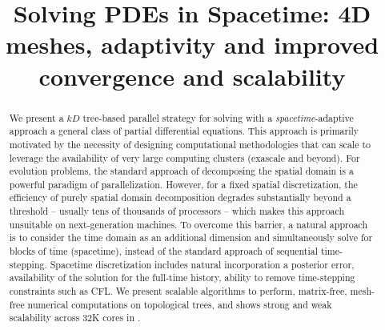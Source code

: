 \documentclass[sigconf]{acmart}
\begin{document}
%
\title{Solving PDEs in Spacetime: 4D meshes, adaptivity and improved convergence and scalability}







%

%
\begin{abstract}
We present a $kD$ tree-based parallel strategy for solving with a {\it spacetime}-adaptive approach a general class of partial differential equations. This approach is primarily motivated by the necessity of designing computational methodologies that can scale to leverage the availability of very large computing clusters (exascale and beyond). For evolution problems, the standard approach of decomposing the spatial domain is a powerful paradigm of parallelization. However, for a fixed spatial discretization, the efficiency of purely spatial domain decomposition degrades substantially beyond a threshold -- usually tens of thousands of processors -- which makes this approach unsuitable on next-generation machines. To overcome this barrier, a natural approach is to consider the time domain as an additional dimension and simultaneously solve for blocks of time (spacetime), instead of the standard approach of sequential time-stepping. Spacetime discretization includes natural incorporation a posterior error, availability of the solution for the full-time history, ability to remove time-stepping constraints such as CFL. We present scalable algorithms to perform, matrix-free, mesh-free numerical computations on topological trees, and shows strong and weak scalability across  32K cores in \Titan.
\end{abstract}
\end{document}
